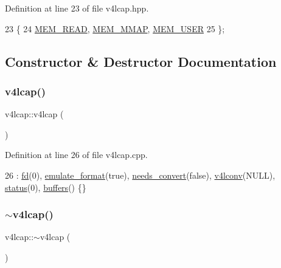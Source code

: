 Definition at line 23 of file v4lcap.\+hpp.


\begin{DoxyCode}
23                      \{
24         \hyperlink{classv4lcap_aae799230441b7965d8947b104d8d753eaa973888f299d63462efa19c3e52d416c}{MEM\_READ}, \hyperlink{classv4lcap_aae799230441b7965d8947b104d8d753ea910bccf6fae3859b962b253fca85ad2a}{MEM\_MMAP}, \hyperlink{classv4lcap_aae799230441b7965d8947b104d8d753ea30efcf7ca101412a17c617333e1bb064}{MEM\_USER}
25     \};
\end{DoxyCode}


\subsection{Constructor \& Destructor Documentation}
\mbox{\label{classv4lcap_adacb93ad544708ef99c5cca4202e7c93}} 
\subsubsection{\texorpdfstring{v4lcap()}{v4lcap()}}
{\footnotesize\ttfamily v4lcap\+::v4lcap (\begin{DoxyParamCaption}{ }\end{DoxyParamCaption})}



Definition at line 26 of file v4lcap.\+cpp.


\begin{DoxyCode}
26 : \hyperlink{classv4lcap_a38109593bde997dad13b3a461569573d}{fd}(0), \hyperlink{classv4lcap_a21b4c152f56ecc309a490cb8ab4ce117}{emulate\_format}(\textcolor{keyword}{true}), \hyperlink{classv4lcap_acd02d2da6ff03a44a2e155af449144e4}{needs\_convert}(\textcolor{keyword}{false}), 
      \hyperlink{classv4lcap_a5e57bbf84383d7b42d0cc9d1e7e03abb}{v4lconv}(NULL), \hyperlink{classv4lcap_ae90192b024d952b464408e0ffd95d90a}{status}(0), \hyperlink{classv4lcap_a046084072d2279bb204ed93cd2692700}{buffers}() \{\}
\end{DoxyCode}
\mbox{\label{classv4lcap_aa1aaea89befb94cdf3dbb24bf758078f}} 
\subsubsection{\texorpdfstring{$\sim$v4lcap()}{~v4lcap()}}
{\footnotesize\ttfamily v4lcap\+::$\sim$v4lcap (\begin{DoxyParamCaption}{ }\end{DoxyParamCaption})}



